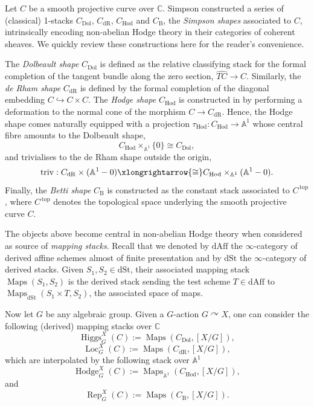 \documentclass[11pt, a4paper]{amsart}
\numberwithin{equation}{section}
\theoremstyle{definition}
\theoremstyle{remark}
\DeclareMathOperator{\Higgs}{Higgs}
\DeclareMathOperator{\Maps}{Maps}
\DeclareMathOperator{\Loc}{Loc}
\DeclareMathOperator{\Rep}{Rep}
\DeclareMathOperator{\Hodge}{Hodge}
\DeclareMathOperator{\triv}{triv}
\DeclareMathOperator{\Dol}{Dol}
\DeclareMathOperator{\dR}{dR}
\DeclareMathOperator{\Hod}{Hod}
\renewcommand{\top}{\mathrm{top}}
\newcommand{\B}{\mathrm{B}}
\renewcommand{\AA}{\mathbb{A}}
\newcommand{\CC}{\mathbb{C}}
\renewcommand{\to}{\longrightarrow}
\newcommand{\acts}{\curvearrowright}
\begin{document}
Let $C$ be a smooth projective curve over $\CC$. Simpson constructed a series of (classical) 1-stacks $C_{\Dol}$, $C_{\dR}$, $C_{\Hod}$ and $C_{\B}$, the \textit{Simpson shapes} associated to $C$, intrinsically encoding non-abelian Hodge theory in their categories of coherent sheaves. We quickly review these constructions here for the reader's convenience.

The \textit{Dolbeault shape} $C_{\Dol}$ is defined \cite{simpson_dolbeault, simpson_dolbeault_2} as the relative classifying stack for the formal completion of the tangent bundle along the zero section, $\widehat{TC} \to C$. Similarly, the \textit{de Rham shape} $C_{\dR}$ is defined by the formal completion of the diagonal embedding $C \hookrightarrow C \times C$. The \textit{Hodge shape} $C_{\Hod}$ is constructed in \cite[§7]{simpson_hodge} by performing a deformation to the normal cone of the morphism $C \to C_{\dR}$. Hence, the Hodge shape comes naturally equipped with a projection $\tau_{\Hod} : C_{\Hod} \to \AA^1$ whose central fibre amounts to the Dolbeault shape, 
\begin{equation} \label{eq Hodge specialises to Dolbeault}
C_{\Hod} \times_{\AA^1} \{0\} \cong C_{\Dol},
\end{equation}
and trivialises to the de Rham shape outside the origin,
\begin{equation} \label{eq Hodge specialises to de Rahm}
\triv : C_{\dR} \times (\AA^1 - 0 ) \xlongrightarrow{\cong} C_{\Hod} \times_{\AA^1} (\AA^1 - 0).
\end{equation}
Finally, the {\it Betti shape} $C_{\B}$ is constructed \cite{simpson_dolbeault} as the constant stack associated to $C^{\, \top}$, where $C^{\, \top}$ denotes the topological space underlying the smooth projective curve $C$. 

The objects above become central in non-abelian Hodge theory when considered as source of {\it mapping stacks}. Recall that we denoted by $\mathrm{dAff}$ the $\infty$-category of derived affine schemes almost of finite presentation and by $\mathrm{dSt}$ the $\infty$-category of derived stacks. Given $S_1, S_2 \in \mathrm{dSt}$, their associated mapping stack $\Maps(S_1,S_2)$ is the derived stack sending the test scheme $T \in \mathrm{dAff}$ to $\Maps_{\mathrm{dSt}}(S_1 \times T, S_2)$, the associated space of maps.





Now let $G$ be any algebraic group. Given a $G$-action $G \acts X$, one can consider the following (derived) mapping stacks over $\CC$
\[
\Higgs_G^X(C) := \Maps(C_{\Dol}, [X/G]),
\] 
\[
\Loc_G^X(C) := \Maps(C_{\dR}, [X/G]),
\]
which are interpolated by the following stack over $\AA^1$
\[
\Hodge_G^X(C) := \Maps_{\AA^1}(C_{\Hod}, [X/G]),
\]
and 
\[
\Rep_G^X(C) := \Maps(C_{\B}, [X/G]).
\] 
\end{document}
